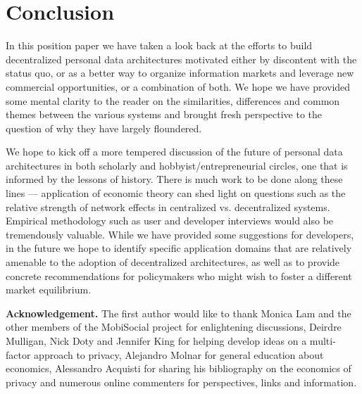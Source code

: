 \documentclass{acm_proc_article-sp}
\begin{document}
\section{Conclusion}
\label{sec:conclusion}

In this position paper we have taken a look back at the efforts to build decentralized personal data architectures motivated either by discontent with the status quo, or as a better way to organize information markets and leverage new commercial opportunities, or a combination of both. We hope we have provided some mental clarity to the reader on the similarities, differences and common themes between the various systems and brought fresh perspective to the question of why they have largely floundered.

We hope to kick off a more tempered discussion of the future of personal data architectures in both scholarly and hobbyist/entrepreneurial circles, one that is informed by the lessons of history. There is much work to be done along these lines --- application of economic theory can shed light on questions such as the relative strength of network effects in centralized vs. decentralized systems. Empirical methodology such as user and developer interviews would also be tremendously valuable. While we have provided some suggestions for developers, in the future we hope to identify specific application domains that are relatively amenable to the adoption of decentralized architectures, as well as to provide concrete recommendations for policymakers who might wish to foster a different market equilibrium.

{\bf Acknowledgement.} The first author would like to thank Monica Lam and the other members of the MobiSocial project for enlightening discussions, Deirdre Mulligan, Nick Doty and Jennifer King for helping develop ideas on a multi-factor approach to privacy, Alejandro Molnar for general education about economics, Alessandro Acquisti for sharing his bibliography on the economics of privacy and numerous online commenters for perspectives, links and information.


\newpage
\onecolumn


\end{document}
